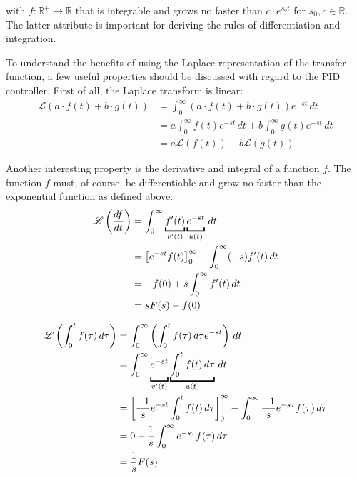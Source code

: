 with $f: \mathbb{R}^+ \to \mathbb{R}$ that is integrable and grows no faster than $c \cdot e^{s_0t}$ for $s_0, c \in \mathbb{R}$. The latter attribute is important for deriving the rules of differentiation and integration.

To understand the benefits of using the Laplace representation of the transfer function, a few useful properties should be discussed with regard to the PID controller. First of all, the Laplace transform is linear:
\begin{align}
    \mathscr{L}\left(a \cdot f(t) + b \cdot g(t) \right) &= \int_0^\infty (a \cdot f(t) + b \cdot g(t)) e^{-st}\,dt \nonumber\\
    &= a \int_0^\infty f(t) e^{-st}\,dt + b \int_0^\infty g(t) e^{-st}\,dt \nonumber\\
    &= a \mathscr{L}\left(f(t)\right) + b \mathscr{L}\left(g(t)\right)
\end{align}

Another interesting property is the derivative and integral of a function $f$. The function $f$ must, of course, be differentiable and grow no faster than the exponential function as defined above:
\begin{align}
    \mathscr{L}\left(\frac{df}{dt}\right) &= \int_0^\infty \underbracket{f'(t)}_{v'(t)} \underbracket{\vphantom{f'(t)}e^{-st}}_{u(t)}\,dt \nonumber\\
    &= \left[e^{-st} f(t) \right]_0^\infty - \int_0^\infty (-s)f'(t)\,dt \nonumber\\
    &= -f(0) + s \int_0^\infty f'(t)\,dt \nonumber\\
    &= s F(s) - f(0)
\end{align}

\begin{align}
    \mathscr{L} \left( \int_0^t f(\tau)\,d\tau \right) &= \int_0^\infty \left(\int_0^t f(\tau)\,d\tau e^{-st} \right)\,dt \nonumber\\
    &= \int_0^\infty \underbracket{e^{-st}\vphantom{\int_0^t}}_{v'(t)} \underbracket{\int_0^t f(t)\,d\tau}_{u(t)}\,dt \nonumber\\
    &= \left[\frac{-1}{s} e^{-st} \int_0^t f(t)\,d\tau \right]_0^\infty - \int_0^\infty \frac{-1}{s} e^{-s\tau} f(\tau)\,d\tau \nonumber\\
    &= 0 + \frac{1}{s} \int_0^\infty e^{-s\tau} f(\tau)\,d\tau \nonumber\\
    &= \frac{1}{s} F(s) \label{eqn:lapace_integration}
\end{align}


